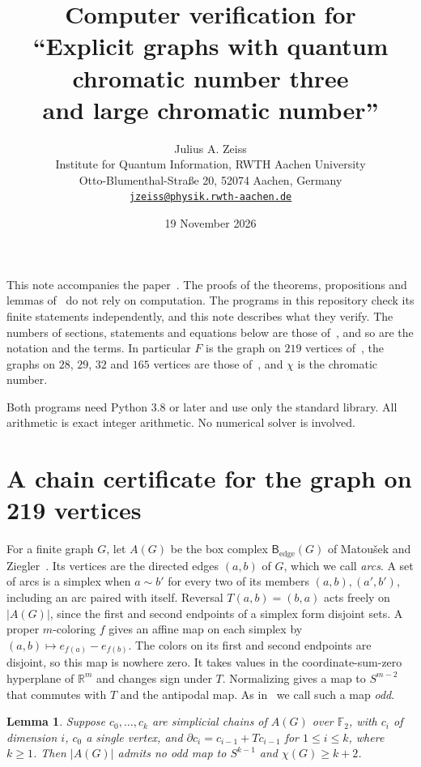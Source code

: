 \documentclass[11pt,a4paper]{article}
\title{Computer verification for\\ ``Explicit graphs with quantum chromatic
number three\\ and large chromatic number''}
\author{Julius A. Zeiss\\[4pt]
{\small Institute for Quantum Information, RWTH Aachen University}\\
{\small Otto-Blumenthal-Stra{\ss}e 20, 52074 Aachen, Germany}\\
{\small \href{mailto:jzeiss@physik.rwth-aachen.de}{\texttt{jzeiss@physik.rwth-aachen.de}}}}
\date{19 November 2026}
\newtheorem{lemma}{Lemma}
\newcommand{\F}{\mathbb{F}_2}
\newcommand{\RR}{\mathbb{R}}
\begin{document}
\maketitle

This note accompanies the paper~\cite{Z}. The proofs of the theorems,
propositions and lemmas of~\cite{Z} do not rely on computation. The programs
in this repository check its finite statements independently, and this note
describes what they verify. The numbers of sections, statements and
equations below are those of~\cite{Z}, and so are the notation and the
terms. In particular $F$ is the graph on $219$ vertices
of~\cite[Section~3]{Z}, the graphs on $28$, $29$, $32$ and $165$ vertices are
those of~\cite[Section~6 and Appendix~C]{Z}, and $\chi$ is the chromatic
number.

Both programs need Python 3.8 or later and use only the standard library.
All arithmetic is exact integer arithmetic. No numerical solver is involved.

\section{A chain certificate for the graph on 219 vertices}

For a finite graph $G$, let $A(G)$ be the box complex
$\mathsf{B}_{\mathrm{edge}}(G)$ of Matou\v{s}ek and Ziegler~\cite{MZ}. Its
vertices are the directed edges $(a,b)$ of $G$, which we call \emph{arcs}.
A set of arcs is a simplex
when $a\sim b'$ for every two of its members $(a,b),(a',b')$, including
an arc paired with itself. Reversal $T(a,b)=(b,a)$ acts freely on
$|A(G)|$, since the first and second endpoints of a simplex form
disjoint sets. A proper $m$-coloring $f$ gives an affine map on each
simplex by $(a,b)\mapsto e_{f(a)}-e_{f(b)}$. The colors on its first
and second endpoints are disjoint, so this map is nowhere zero.
It takes values in the coordinate-sum-zero hyperplane of $\RR^m$ and
changes sign under $T$. Normalizing gives a map to $S^{m-2}$ that commutes
with $T$ and the antipodal map. As in~\cite{Z} we call such a map
\emph{odd}.

\begin{lemma}\label{lem:certificate}
Suppose $c_0,\ldots,c_k$ are simplicial chains of $A(G)$ over $\F$,
with $c_i$ of dimension $i$, $c_0$ a single vertex, and
$\partial c_i=c_{i-1}+Tc_{i-1}$ for $1\le i\le k$, where $k\ge1$.
Then $|A(G)|$ admits no odd map to $S^{k-1}$ and $\chi(G)\ge k+2$.
\end{lemma}
\end{document}

